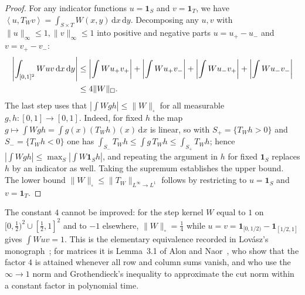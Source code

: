 \documentclass[11pt,a4paper,reqno]{amsart}
\theoremstyle{definition}
\numberwithin{equation}{section}
\newcommand{\cutnorm}[1]{\|#1\|_{\square}}
\newcommand{\inner}[2]{\left\langle #1, #2 \right\rangle}
\newcommand{\dif}{\,\mathrm{d}}
\begin{document}
\begin{proof}
For any indicator functions $u = \mathbf{1}_S$ and $v = \mathbf{1}_T$, we have $\inner{u}{T_W v} = \int_{S \times T} W(x,y) \dif x \dif y$. Decomposing any $u, v$ with $\|u\|_\infty \le 1, \|v\|_\infty \le 1$ into positive and negative parts $u = u_+ - u_-$ and $v = v_+ - v_-$:
\begin{align}
    \left|\int_{[0,1]^2} W u v \dif x \dif y\right| 
    &\le \left|\int W u_+ v_+\right| + \left|\int W u_+ v_-\right| + \left|\int W u_- v_+\right| + \left|\int W u_- v_-\right| \notag \\
    &\le 4 \cutnorm{W}.
\end{align}
The last step uses that $\left|\int W g h\right| \le \cutnorm{W}$ for all measurable $g, h \colon [0,1] \to [0,1]$. Indeed, for fixed $h$ the map $g \mapsto \int W g h = \int g(x) (T_W h)(x) \dif x$ is linear, so with $S_+ = \{T_W h > 0\}$ and $S_- = \{T_W h < 0\}$ one has $\int_{S_-} T_W h \le \int g\, T_W h \le \int_{S_+} T_W h$; hence $|\int W g h| \le \max_{S} |\int W \mathbf{1}_S h|$, and repeating the argument in $h$ for fixed $\mathbf{1}_S$ replaces $h$ by an indicator as well. Taking the supremum establishes the upper bound. The lower bound $\cutnorm{W} \le \|T_W\|_{L^\infty \to L^1}$ follows by restricting to $u = \mathbf{1}_S$ and $v = \mathbf{1}_T$.
\end{proof}
The constant $4$ cannot be improved: for the step kernel $W$ equal to $1$ on $[0,\frac12)^2 \cup [\frac12,1]^2$ and to $-1$ elsewhere, $\cutnorm{W} = \frac14$ while $u = v = \mathbf{1}_{[0,1/2)} - \mathbf{1}_{[1/2,1]}$ gives $\int W u v = 1$. This is the elementary equivalence recorded in Lov\'asz's monograph~\cite[Ch.~8]{lovasz2012large}; for matrices it is Lemma~3.1 of Alon and Naor~\cite{alon2006approximating}, who show that the factor $4$ is attained whenever all row and column sums vanish, and who use the $\infty \to 1$ norm and Grothendieck's inequality to approximate the cut norm within a constant factor in polynomial time.
\end{document}
